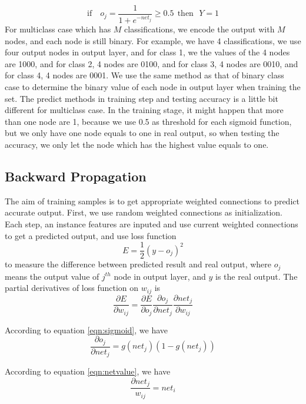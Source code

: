 \documentclass[11pt,letterpaper]{article}
\begin{document}
\begin{equation}
\label{eqn:YEquals1}
\text{if ~~} o_j = \frac{1}{1+e^{-net_j}} \geq 0.5 ~~\text{then~~} Y=1
\end{equation}
For multiclass case which has $M$ classifications, we encode the output with $M$ nodes, and each node is still binary. For example, we have 4 classifications, we use four output nodes in output layer, and for class 1, we the values of the 4 nodes are 1000, and for class 2, 4 nodes are 0100, and for class 3, 4 nodes are 0010, and for class 4, 4 nodes are 0001. We use the same method as that of binary class case to determine the binary value of each node in output layer when training the set. 
The predict methods in training step and testing accuracy is a little bit different for multiclass case. In the training stage, it might happen that more than one node are 1, because we use 0.5 as threshold for each sigmoid function, but we only have one node equals to one in real output, so when testing the accuracy, we only let the node which has the highest value equals to one. 

\subsection{Backward Propagation}
The aim of training samples is to get appropriate weighted connections to predict accurate output. First, we use random weighted connections as initialization. Each step, an instance features are inputed and use current weighted connections to get a predicted output, and use loss function
\begin{equation}
\label{eqn:loss}
E=\frac{1}{2}(y-o_j)^2
\end{equation} 
to measure the difference between predicted result and real output, where $o_j$ means the output value of $j^{th}$ node in output layer, and $y$ is the real output. The partial derivatives of loss function on $w_{ij}$ is 
\begin{equation}
\label{eqn:partialLoss}
\frac{\partial E}{\partial w_{ij}} = \frac{\partial E}{\partial o_j} \frac{\partial o_j}{\partial net_j} \frac{\partial net_j}{\partial w_{ij}}
\end{equation}


According to equation \ref{eqn:sigmoid}, we have
\begin{equation}
\label{eqn:partialOjNetj}
\frac{\partial o_j}{\partial net_j} = g(net_j)(1-g(net_j))
\end{equation}

According to equation \ref{eqn:netvalue}, we have
\begin{equation}
\label{eqn:partialNetjNeti}
\frac{\partial net_j}{w_{ij}} = net_i
\end{equation}
\end{document}
